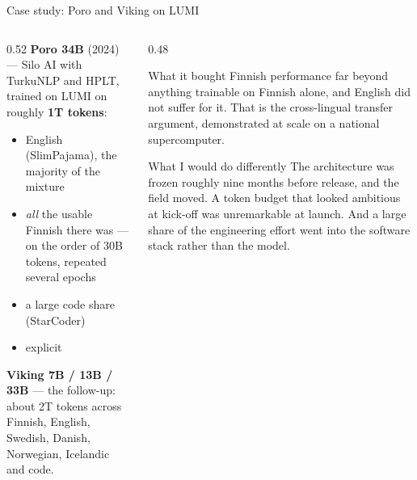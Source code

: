 \documentclass[aspectratio=169,10pt]{beamer}
\begin{document}
\begin{frame}[shrink=8]{Case study: Poro and Viking on LUMI}
  \begin{columns}[T]
    \begin{column}{0.52\textwidth}
      \textbf{Poro 34B} (2024) --- Silo AI with TurkuNLP and HPLT, trained on
      LUMI on roughly \textbf{1T tokens}:
      \begin{itemize}\small
        \item English (SlimPajama), the majority of the mixture
        \item \emph{all} the usable Finnish there was --- on the order of 30B
          tokens, repeated several epochs
        \item a large code share (StarCoder)
        \item explicit 
      \end{itemize}
      \vspace{0.4em}
      \textbf{Viking 7B / 13B / 33B} --- the follow-up: about 2T tokens
      across Finnish, English, Swedish, Danish, Norwegian, Icelandic and code.
    \end{column}
    \begin{column}{0.48\textwidth}
      \begin{block}{What it bought}
        \small
        Finnish performance far beyond anything trainable on Finnish alone,
        and English did not suffer for it. That is the cross-lingual transfer
        argument, demonstrated at scale on a national supercomputer.
      \end{block}
      \begin{block}{What I would do differently}
        \small
        The architecture was frozen roughly nine months before release, and the
        field moved. A token budget that looked ambitious at kick-off was
        unremarkable at launch. And a large share of the engineering effort
        went into the software stack rather than the model.
      \end{block}
    \end{column}
  \end{columns}
\end{frame}
\end{document}
